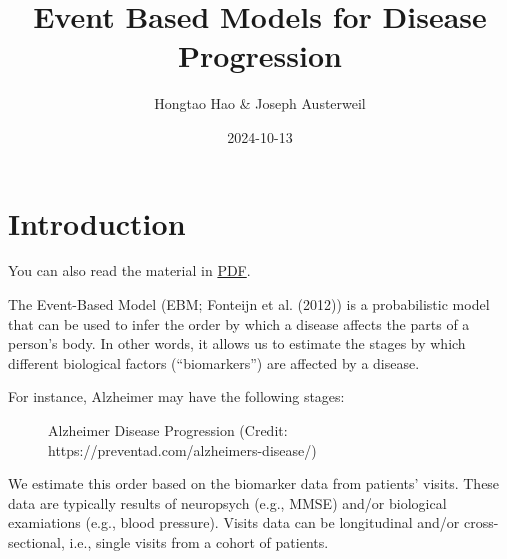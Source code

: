 \documentclass[
  letterpaper,
  DIV=11,
  numbers=noendperiod]{scrreprt}
\title{Event Based Models for Disease Progression}
\author{Hongtao Hao \& Joseph Austerweil}
\date{2024-10-13}
\renewcommand*\contentsname{Table of contents}
\newcommand\contentsname{Table of contents}
\begin{document}
\maketitle

\renewcommand*\contentsname{Table of contents}
{
\hypersetup{linkcolor=}
\setcounter{tocdepth}{2}
\tableofcontents
}


\chapter{Introduction}\label{introduction}

You can also read the material in
\href{Event-Based-Models-for-Disease-Progression.pdf}{PDF}.

The Event-Based Model (EBM; Fonteijn et al. (2012)) is a probabilistic
model that can be used to infer the order by which a disease affects the
parts of a person's body. In other words, it allows us to estimate the
stages by which different biological factors (``biomarkers'') are
affected by a disease.

For instance, Alzheimer may have the following stages:

\begin{figure}


\caption{\label{fig-ad-progression}Alzheimer Disease Progression
(Credit: https://preventad.com/alzheimers-disease/)}

\end{figure}%

We estimate this order based on the biomarker data from patients'
visits. These data are typically results of neuropsych (e.g., MMSE)
and/or biological examiations (e.g., blood pressure). Visits data can be
longitudinal and/or cross-sectional, i.e., single visits from a cohort
of patients.
\end{document}
